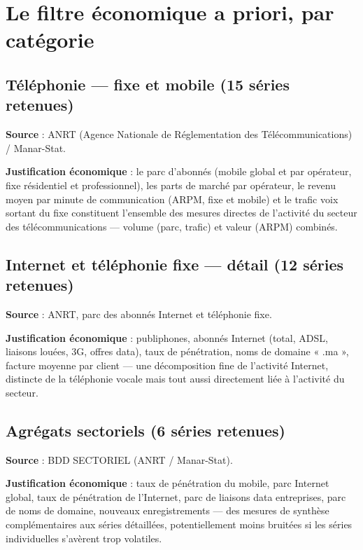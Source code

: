 \documentclass[11pt,a4paper]{article}
\begin{document}
\section{Le filtre économique a priori, par catégorie}

\subsection{Téléphonie --- fixe et mobile (15 séries retenues)}

\textbf{Source} : ANRT (Agence Nationale de Réglementation des Télécommunications) / Manar-Stat.

\textbf{Justification économique} : le parc d'abonnés (mobile global et par opérateur, fixe résidentiel et professionnel), les parts de marché par opérateur, le revenu moyen par minute de communication (ARPM, fixe et mobile) et le trafic voix sortant du fixe constituent l'ensemble des mesures directes de l'activité du secteur des télécommunications --- volume (parc, trafic) et valeur (ARPM) combinés.

\subsection{Internet et téléphonie fixe --- détail (12 séries retenues)}

\textbf{Source} : ANRT, parc des abonnés Internet et téléphonie fixe.

\textbf{Justification économique} : publiphones, abonnés Internet (total, ADSL, liaisons louées, 3G, offres data), taux de pénétration, noms de domaine « .ma », facture moyenne par client --- une décomposition fine de l'activité Internet, distincte de la téléphonie vocale mais tout aussi directement liée à l'activité du secteur.

\subsection{Agrégats sectoriels (6 séries retenues)}

\textbf{Source} : BDD SECTORIEL (ANRT / Manar-Stat).

\textbf{Justification économique} : taux de pénétration du mobile, parc Internet global, taux de pénétration de l'Internet, parc de liaisons data entreprises, parc de noms de domaine, nouveaux enregistrements --- des mesures de synthèse complémentaires aux séries détaillées, potentiellement moins bruitées si les séries individuelles s'avèrent trop volatiles.
\end{document}
